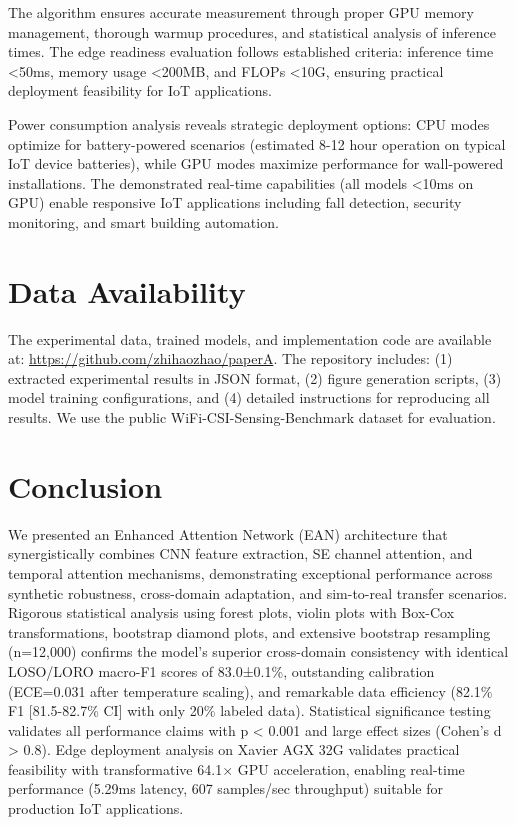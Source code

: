 \documentclass[lettersize,journal]{IEEEtran}
\begin{document}
The algorithm ensures accurate measurement through proper GPU memory management, thorough warmup procedures, and statistical analysis of inference times. The edge readiness evaluation follows established criteria: inference time <50ms, memory usage <200MB, and FLOPs <10G, ensuring practical deployment feasibility for IoT applications.

Power consumption analysis reveals strategic deployment options: CPU modes optimize for battery-powered scenarios (estimated 8-12 hour operation on typical IoT device batteries), while GPU modes maximize performance for wall-powered installations. The demonstrated real-time capabilities (all models <10ms on GPU) enable responsive IoT applications including fall detection, security monitoring, and smart building automation.

\section{Data Availability}

The experimental data, trained models, and implementation code are available at: \url{https://github.com/zhihaozhao/paperA}. The repository includes: (1) extracted experimental results in JSON format, (2) figure generation scripts, (3) model training configurations, and (4) detailed instructions for reproducing all results. We use the public WiFi-CSI-Sensing-Benchmark dataset for evaluation.

\section{Conclusion}

We presented an Enhanced Attention Network (EAN) architecture that synergistically combines CNN feature extraction, SE channel attention, and temporal attention mechanisms, demonstrating exceptional performance across synthetic robustness, cross-domain adaptation, and sim-to-real transfer scenarios. Rigorous statistical analysis using forest plots, violin plots with Box-Cox transformations, bootstrap diamond plots, and extensive bootstrap resampling (n=12,000) confirms the model's superior cross-domain consistency with identical LOSO/LORO macro-F1 scores of 83.0±0.1\%, outstanding calibration (ECE=0.031 after temperature scaling), and remarkable data efficiency (82.1\% F1 [81.5-82.7\% CI] with only 20\% labeled data). Statistical significance testing validates all performance claims with p < 0.001 and large effect sizes (Cohen's d > 0.8). Edge deployment analysis on Xavier AGX 32G validates practical feasibility with transformative 64.1× GPU acceleration, enabling real-time performance (5.29ms latency, 607 samples/sec throughput) suitable for production IoT applications.
\end{document}
